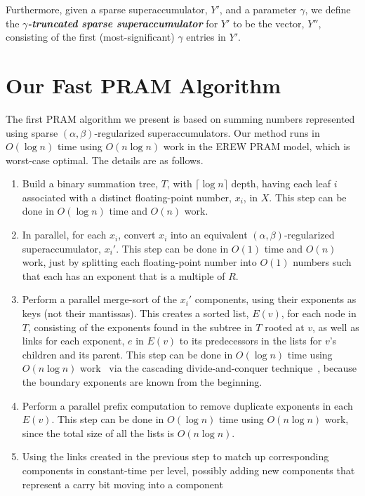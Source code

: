 \documentclass[11pt]{article}
\renewcommand{\emph}[1]{\textit{\textbf{#1}}}
\begin{document}
Furthermore,
given a sparse superaccumulator, $Y'$, and a parameter $\gamma$, we define the 
\emph{$\gamma$-truncated sparse superaccumulator} for $Y'$
to be the vector, $Y''$,
consisting of the first (most-significant) $\gamma$ entries in $Y'$.


\section{Our Fast PRAM Algorithm}
\label{sec:pram}

The
first PRAM algorithm we present is based on 
summing numbers represented using sparse $(\alpha,\beta)$-regularized
superaccumulators.
Our method runs in $O(\log n)$ time using $O(n\log n)$ work in the EREW PRAM
model, which is worst-case optimal.
The details are as follows.
\begin{enumerate}
\item
Build a binary summation tree, $T$, with $\lceil\log n\rceil$ depth,
having each leaf $i$ associated with a distinct floating-point number,
$x_i$, in $X$.
This step can be done in $O(\log n)$ time and $O(n)$ work.
\item
In parallel, for each $x_i$, convert $x_i$
into an equivalent 
$(\alpha,\beta)$-regularized superaccumulator, $x_i'$.
This step can be done in $O(1)$ time and $O(n)$ work, just by
splitting each floating-point number into $O(1)$ numbers such that
each has an exponent that is a multiple of $R$.
\item
Perform a parallel merge-sort of the $x_i'$ components, using their
exponents as keys (not their mantissas).  This creates a sorted list,
$E(v)$, for each node in $T$, consisting of the exponents found in
the subtree in $T$ rooted at $v$, as well as links for each exponent,
$e$ in $E(v)$ to its predecessors in the lists for $v$'s children and
its parent.
This step can be done in $O(\log n)$ time using $O(n\log n)$
work~\cite{doi:10.1137/0217049,Goodrich:1996:SPP:226643.226670} 
via the cascading divide-and-conquer 
technique~\cite{doi:10.1137/0218035}, because the boundary exponents
are known from the beginning.
\item
Perform a parallel prefix computation to remove duplicate exponents
in each $E(v)$.
This step can be done in $O(\log n)$ time using $O(n\log n)$
work, since the total size of all the lists is $O(n\log n)$.
\item
Using the links created in the previous step to match up
corresponding components in constant-time per level, possibly adding
new components that represent a carry bit moving into a component

\end{enumerate}
\end{document}
